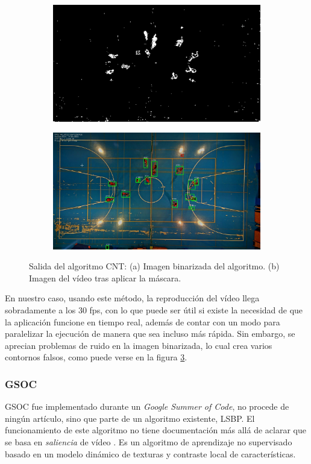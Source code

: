 \begin{figure}
\begin{subfigure}{.5\textwidth}
  \centering
  \includegraphics[width=.9\linewidth]{images/CNTsub}
  \caption { }
  \label{fig:CNT1a}
\end{subfigure}%
\begin{subfigure}{.5\textwidth}
  \centering
  \includegraphics[width=.9\linewidth]{images/CNT}
  \caption { }
  \label{fig:CNT1b}
\end{subfigure}
\caption{Salida del algoritmo CNT: (a) Imagen binarizada del algoritmo. (b) Imagen del vídeo tras aplicar la máscara.}
\label{fig:CNT}
\end{figure}

En nuestro caso, usando este método, la reproducción del vídeo llega sobradamente a los 30 fps, con lo que puede ser útil si existe la necesidad de que la aplicación funcione en tiempo real, además de contar con un modo para paralelizar la ejecución de manera que sea incluso más rápida. Sin embargo, se aprecian problemas de ruido en la imagen binarizada, lo cual crea varios contornos falsos, como puede verse en la figura \ref{fig:CNT}.

\subsubsection*{GSOC}
GSOC fue implementado durante un \textit{Google Summer of Code}, no procede de ningún artículo, sino que parte de un algoritmo existente, LSBP. El funcionamiento de este algoritmo no tiene documentación más allá de aclarar que se basa en \textit{saliencia} de vídeo \cite{4967608}. Es un algoritmo de aprendizaje no supervisado basado en un modelo dinámico de texturas y contraste local de características.

